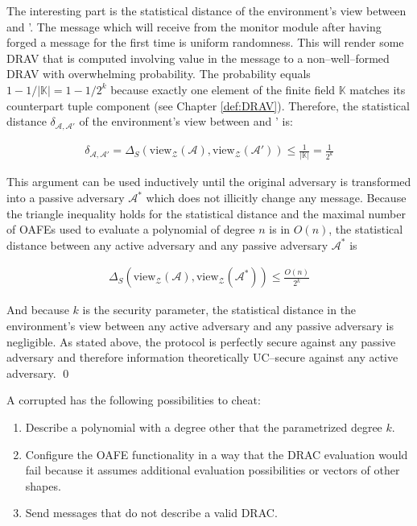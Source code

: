 The interesting part is the statistical distance of the environment's view
between \JWadv{} and \JWadv{}'. The message which \JWadv{} will receive from the
monitor module after having forged a message for the first time is uniform
randomness.  This will render some DRAV that is computed involving value in the
message to a non--well--formed DRAV with overwhelming probability. The
probability equals $1-1/|\mathbb{K}| = 1-1/2^k$ because exactly one element of
the finite field $\mathbb{K}$ matches its counterpart tuple component (see
Chapter \ref{def:DRAV}). Therefore, the statistical distance
$\delta_{\mathcal{A},\mathcal{A}'}$ of the environment's view between \JWadv{}
and \JWadv{}' is:

\begin{align*}
  \delta_{\mathcal{A},\mathcal{A}'} =
  \Delta_S(\text{view}_\mathcal{Z}(\mathcal{A}),
  \text{view}_\mathcal{Z}(\mathcal{A}'))
  \leq \frac{1}{|\mathbb{K}|}
  = \frac{1}{2^k}
\end{align*}

\noindent{}This argument can be used inductively until the original adversary
\JWadv{} is transformed into a passive adversary $\mathcal{A}^*$ which does not
illicitly change any message. Because the triangle inequality holds for the
statistical distance and the maximal number of OAFEs used to evaluate a
polynomial of degree $n$ is in $O(n)$, the statistical distance between any
active adversary \JWadv{} and any passive adversary $\mathcal{A}^*$ is

\begin{align*}
  \Delta_S(\text{view}_\mathcal{Z}(\mathcal{A}),
  \text{view}_\mathcal{Z}(\mathcal{A}^*))
  \leq \frac{O(n)}{2^k}
\end{align*}

\noindent{}And because $k$ is the security parameter, the statistical distance
in the environment's view between any active adversary and any passive adversary
is negligible. As stated above, the protocol is perfectly secure against any
passive adversary and therefore information theoretically UC--secure against any
active adversary. \qed



A corrupted \JWpOne{} has the following possibilities to cheat:

\begin{enumerate}

  \item Describe a polynomial with a degree other that the parametrized degree
    $k$.

  \item Configure the OAFE functionality in a way that the DRAC evaluation would
    fail because it assumes additional evaluation possibilities or vectors of
    other shapes.

  \item Send messages that do not describe a valid DRAC\@.

\end{enumerate}

